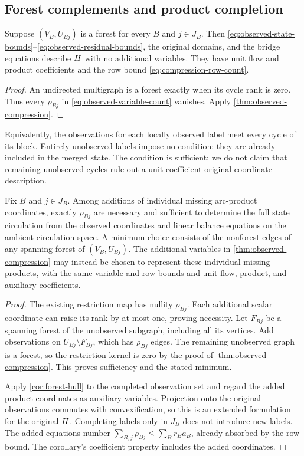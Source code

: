 \subsection{Forest complements and product completion}\label{subsec:forest-complements}
\begin{corollary}\label{cor:forest-hull}
Suppose $(V_B,U_{Bj})$ is a forest for every $B$ and $j\in J_B$.
Then \eqref{eq:observed-state-bounds}--\eqref{eq:observed-residual-bounds},
the original domains, and the bridge equations describe $H$ with no
additional variables. They have unit flow and product coefficients and
the row bound \eqref{eq:compression-row-count}.
\end{corollary}
\begin{proof}
An undirected multigraph is a forest exactly when its cycle rank is zero.
Thus every $\rho_{Bj}$ in \eqref{eq:observed-variable-count} vanishes.
Apply \cref{thm:observed-compression}.
\end{proof}

Equivalently, the observations for each locally observed label meet every
cycle of its block. Entirely unobserved labels impose no condition: they
are already included in the merged state. The condition is sufficient;
we do not claim that remaining unobserved cycles rule out a unit-coefficient
original-coordinate description.

\begin{proposition}\label{prop:minimum-completion}
Fix $B$ and $j\in J_B$. Among additions of individual missing arc-product
coordinates, exactly $\rho_{Bj}$ are necessary and sufficient to determine
the full state circulation from the observed coordinates and linear balance
equations on the ambient circulation space. A minimum choice consists of
the nonforest edges of any spanning forest of $(V_B,U_{Bj})$.
The additional variables in \cref{thm:observed-compression} may instead be
chosen to represent these individual missing products, with the same
variable and row bounds and unit flow, product, and auxiliary coefficients.
\end{proposition}
\begin{proof}
The existing restriction map has nullity $\rho_{Bj}$. Each additional
scalar coordinate can raise its rank by at most one, proving necessity.
Let $F_{Bj}$ be a spanning forest of the unobserved subgraph, including
all its vertices. Add observations on $U_{Bj}\setminus F_{Bj}$, which
has $\rho_{Bj}$ edges. The remaining unobserved graph is a forest, so
the restriction kernel is zero by the proof of
\cref{thm:observed-compression}. This proves sufficiency and the stated
minimum.

Apply \cref{cor:forest-hull} to the completed observation set and regard
the added product coordinates as auxiliary variables. Projection onto the
original observations commutes with convexification, so this is an extended
formulation for the original $H$. Completing labels only in $J_B$
does not introduce new labels. The added equations number
$\sum_{B,j}\rho_{Bj}\le\sum_Br_Ba_B$, already absorbed by the row
bound. The corollary's coefficient property includes the added coordinates.
\end{proof}

